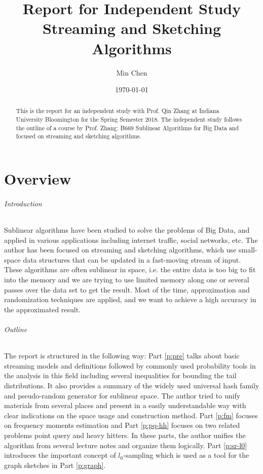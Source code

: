 \documentclass[11pt]{article}
\theoremstyle{plain}
\begin{document}
\title{Report for Independent Study\\
Streaming and Sketching Algorithms}
\author{Min Chen}
\date{\today}
\maketitle
\thispagestyle{fancy}

\begin{abstract}
This is the report for an independent study with Prof. Qin Zhang at Indiana 
University Bloomington for the Spring Semester 2018. The independent study 
follows the outline of a course by Prof. Zhang: B669 Sublinear Algorithms for 
Big Data and focused on streaming and sketching algorithms. 
\end{abstract}
\pagebreak
\tableofcontents
\pagebreak

\part{Overview}
\paragraph{Introduction}
Sublinear algorithms have been studied to solve the problems of Big Data, 
and applied in various applications including internet traffic, social networks, 
etc. The author has been focused on streaming and sketching algorithms, 
which use small-space data structures that can be updated in a fast-moving 
stream of input. These algorithms are often sublinear in space, i.e. the entire 
data is too big to fit into the memory and we are trying to use limited memory 
along one or several passes over the data set to get the result. Most of the 
time, approximation and randomization techniques are applied, and we want 
to achieve a high accuracy in the approximated result.  

\paragraph{Outline}The report is structured in the following way: 
Part \ref{p:pre} talks about basic streaming models and definitions followed 
by commonly used probability tools in the analysis in this field including 
several inequalities for bounding the tail distributions. It also provides a 
summary of the widely used universal hash family and pseudo-random 
generator for sublinear space. The author tried to unify materials from 
several places and present in a easily understandable way with clear 
indications on the space usage and construction method. Part \ref{p:fm} 
focuses on frequency moments estimation and Part \ref{p:pq-hh} focuses on 
two related problems point query and heavy hitters. In these parts, the 
author unifies the algorithm from several lecture notes and organize them 
logically. Part \ref{p:sr-l0} introduces the important concept of 
$l_0$-sampling which is used as a tool for the graph sketches in Part 
\ref{p:graph}.
\end{document}
